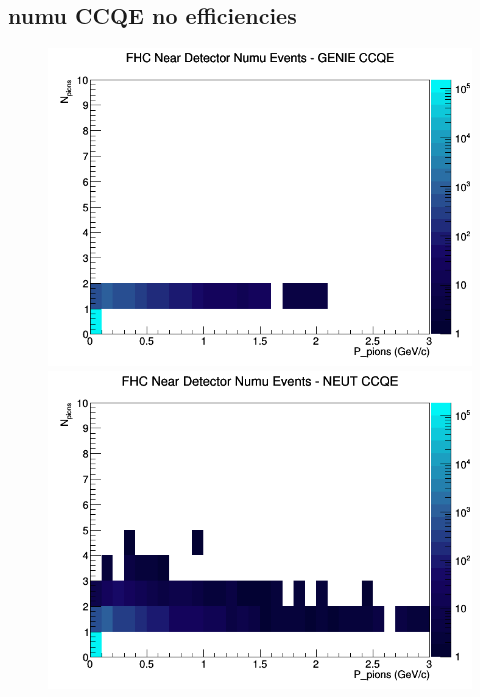 \documentclass[12pt]{article}
\begin{document}
\subsection{numu CCQE no efficiencies}
\begin{figure}[h]
\includegraphics[width=\linewidth]{N_P/nominal/pions/CCQE_FHC_ND_numu_N_P_GENIE.png}
\endminipage
{}
\includegraphics[width=\linewidth]{N_P/nominal/pions/CCQE_FHC_ND_numu_N_P_NEUT.png}
\endminipage
{}

\end{figure}
\end{document}

